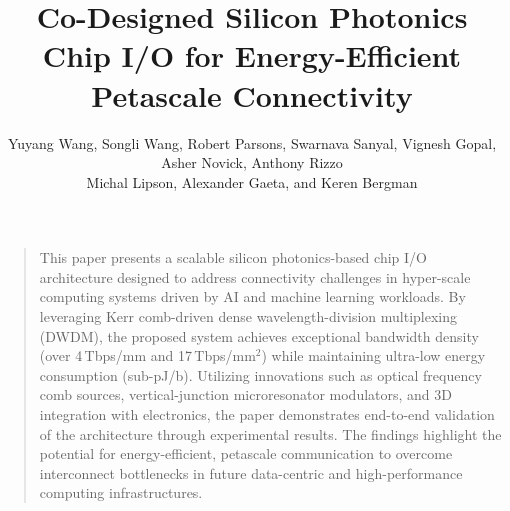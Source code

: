



\usepackage{pdfpages} %

\pretitle{\begin{center}\LARGE}
\posttitle{\end{center}\vspace{-1.0em}}
\predate{}
\postdate{}

\title{Co-Designed Silicon Photonics Chip I/O for Energy-Efficient Petascale Connectivity}
\author{Yuyang Wang, Songli Wang, Robert Parsons, Swarnava Sanyal, Vignesh Gopal,
Asher Novick, Anthony Rizzo\\Michal Lipson, Alexander Gaeta, and Keren Bergman}
\date{}

\fancyfoot[L]{\scshape \MakeLowercase{\myName{}}}




\maketitle%
\thispagestyle{fancy}

\begin{quote}
    \large
    This paper presents a scalable silicon photonics-based chip I/O architecture designed to address connectivity challenges in hyper-scale computing systems driven by AI and machine learning workloads. By leveraging Kerr comb-driven dense wavelength-division multiplexing (DWDM), the proposed system achieves exceptional bandwidth density (over 4\,Tbps/mm and 17\,Tbps/mm$^2$) while maintaining ultra-low energy consumption (sub-pJ/b). Utilizing innovations such as optical frequency comb sources, vertical-junction microresonator modulators, and 3D integration with electronics, the paper demonstrates end-to-end validation of the architecture through experimental results. The findings highlight the potential for energy-efficient, petascale communication to overcome interconnect bottlenecks in future data-centric and high-performance computing infrastructures.
\end{quote}



